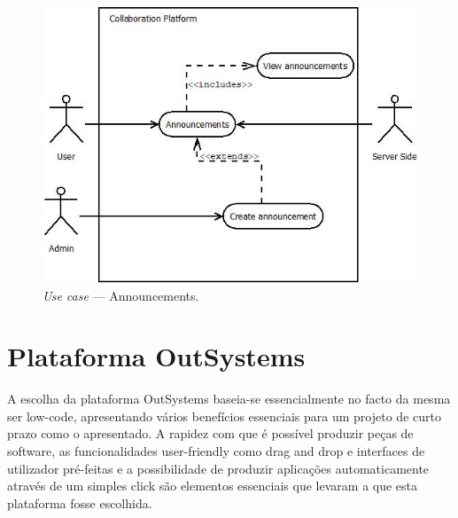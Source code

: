 \begin{figure}[H]
    \centering
    \includegraphics[scale=0.8]{figures/Announcements use case.jpeg}
    \caption{\textit{Use case} --- Announcements.}\label{fig:uc:announcements}
\end{figure}

\section{Plataforma OutSystems}\label{sec:plataformaOutSystems}

A escolha da plataforma OutSystems baseia-se essencialmente no facto da mesma ser low-code,
apresentando vários benefícios essenciais para um projeto de curto prazo como o apresentado. A rapidez
com que é possível produzir peças de software, as funcionalidades user-friendly como drag and drop e 
interfaces de utilizador pré-feitas e a possibilidade de produzir aplicações automaticamente através de
um simples click são elementos essenciais que levaram a que esta plataforma fosse escolhida.